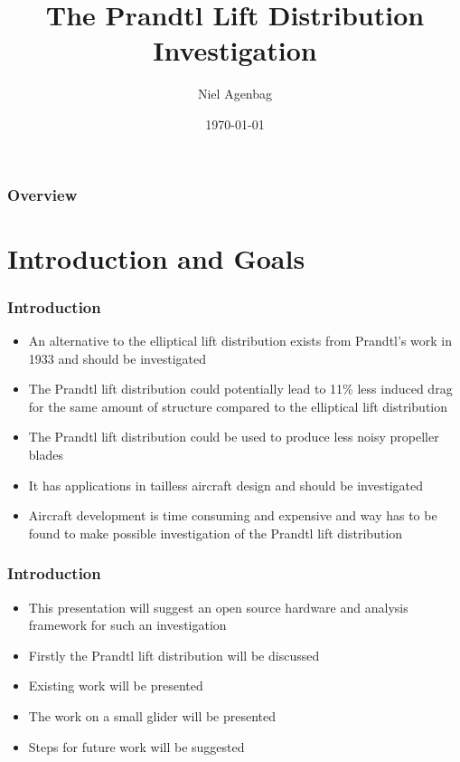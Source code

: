 \documentclass{beamer}
\title[Prandtl Investigation]{The Prandtl Lift Distribution Investigation} %
\author{Niel Agenbag} %
\institute[Unaffiliated] %
{
Unaffiliated \\ %
\medskip
\textit{Ludwigprandtlwing@gmail.com} %
}
\date{\today} %
\begin{document}
\begin{frame}
\titlepage %
\end{frame}

\begin{frame}
\frametitle{Overview} %
\tableofcontents %
\end{frame}


\section{Introduction and Goals}

\begin{frame}
\frametitle{Introduction}
\begin{itemize}
\item An alternative to the elliptical lift distribution exists from Prandtl's work in 1933 \cite{Prandtl1933} and should be investigated 
\item The Prandtl lift distribution could potentially lead to 11\% less induced drag for the same amount of structure compared to the elliptical lift distribution
\item The Prandtl lift distribution could be used to produce less noisy propeller blades
\item It has applications in tailless aircraft design and should be investigated
\item Aircraft development is time consuming and expensive and way has to be found to make possible investigation of the Prandtl lift distribution
\end{itemize}
\end{frame}

\begin{frame}
\frametitle{Introduction}
\begin{itemize}
\item This presentation will suggest an open source hardware and analysis framework for such an investigation 
\item Firstly the Prandtl lift distribution will be discussed
\item Existing work will be presented
\item The work on a small glider will be presented
\item Steps for future work will be suggested
\end{itemize}
\end{frame}
\end{document}
